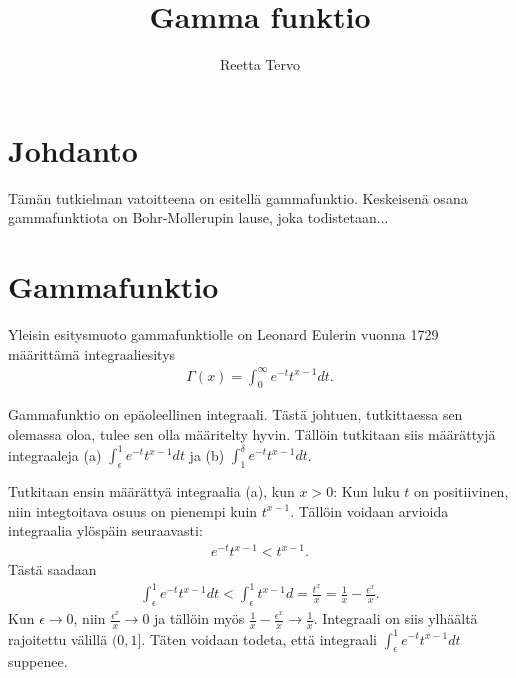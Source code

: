 \documentclass[12pt]{article}
\title{Gamma funktio}
\author{Reetta Tervo}
\theoremstyle{definition}
\theoremstyle{plain}
\begin{document}
\maketitle

\newpage
\tableofcontents

\newpage
\section{Johdanto}
\onehalfspacing
Tämän tutkielman vatoitteena on esitellä gammafunktio. Keskeisenä osana gammafunktiota on Bohr-Mollerupin lause, joka todistetaan...

\newpage





\section{Gammafunktio}
Yleisin esitysmuoto gammafunktiolle on Leonard Eulerin vuonna 1729 määrittämä integraaliesitys
\begin{align}
     \Gamma(x) = \int_{0}^{\infty} e^{-t} t^{x-1} dt.
\end{align}

Gammafunktio on epäoleellinen integraali. Tästä johtuen, tutkittaessa sen olemassa oloa, tulee sen olla määritelty hyvin. Tällöin tutkitaan siis määrättyjä integraaleja (a) $\int_{\epsilon}^{1} e^{-t} t^{x-1} dt$ ja (b) $\int_{1}^{\delta} e^{-t} t^{x-1} dt$.\newline

Tutkitaan ensin määrättyä integraalia (a), kun $x>0$:\newline
Kun luku $t$ on positiivinen, niin integtoitava osuus on pienempi kuin $t^{x-1}$. Tällöin voidaan arvioida integraalia ylöspäin seuraavasti:
\begin{align*}
    e^{-t} t^{x-1} < t^{x-1}.
\end{align*} 
Tästä saadaan 
\begin{align*}
    \int_{\epsilon}^{1} e^{-t} t^{x-1} dt < \int_{\epsilon}^{1} t^{x-1} d = \frac{t^x}{x} = \frac{1}{x} - \frac{\epsilon^x}{x}.
\end{align*}
Kun $\epsilon \rightarrow 0$, niin $\frac{\epsilon^x}{x} \rightarrow 0$ ja tällöin myös $\frac{1}{x}-\frac{\epsilon^x}{x} \rightarrow \frac{1}{x}$. Integraali on siis ylhäältä rajoitettu välillä $(0, 1]$. Täten voidaan todeta, että integraali $\int_{\epsilon}^{1} e^{-t} t^{x-1} dt$ suppenee. \newline
\end{document}
